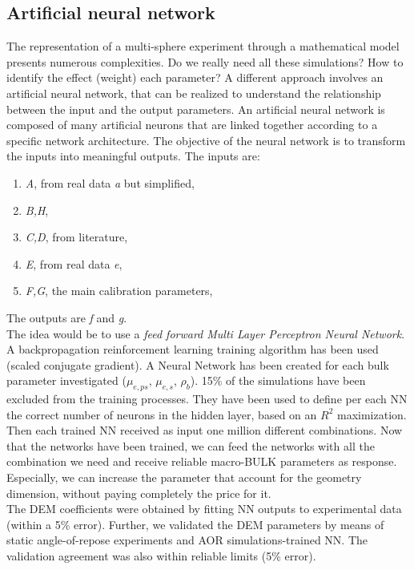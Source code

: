 \subsection{Artificial neural network}
\label{subsection:artificialneuralnetwork}

The representation of a multi-sphere experiment through a mathematical model presents numerous complexities.
Do we really need all these simulations?
How to identify the effect (weight) each parameter?
A different approach involves an artificial neural network, that can be realized to understand the relationship between the input and the output parameters.
An artificial neural network is composed of many artificial neurons that are linked together according to a specific network architecture. The objective of the neural network is to transform the inputs into meaningful outputs.
The inputs are:
\begin{enumerate}
\item{\textit{A}, from real data \textit{a} but simplified,}
\item{\textit{B,H},}
\item{\textit{C,D}, from literature,}
\item{\textit{E}, from real data \textit{e},}
\item{\textit{F,G}, the main calibration parameters,}
\end{enumerate}

The outputs are \textit{f} and \textit{g}.\\

The idea would be to use a \textit{feed forward Multi Layer Perceptron Neural Network}.
A backpropagation reinforcement learning training algorithm has been used (scaled conjugate gradient).
A Neural Network has been created for each bulk parameter investigated ($\mu_{e,ps}$, $\mu_{e,s}$, $\rho_{b}$).
15\% of the simulations have been excluded from the training processes.
They have been used to define per each NN the correct number of neurons in the hidden layer, based on an $R^2$ maximization.
Then each trained NN received as input one million different combinations.
Now that the networks have been trained, we can feed the networks with all the combination we need and receive reliable macro-BULK parameters as response.
Especially, we can increase the parameter that account for the geometry dimension, without paying completely the price for it.\\
The DEM coefficients were obtained by fitting NN outputs to experimental data (within a 5\% error).
Further, we validated the DEM parameters by means of static angle-of-repose experiments and AOR simulations-trained NN.
The validation agreement was also within reliable limits (5\% error).\\


